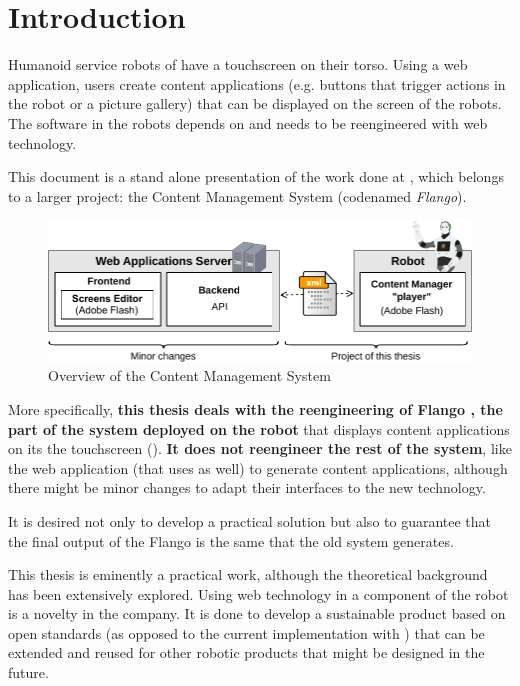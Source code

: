 \chapter{Introduction}

Humanoid service robots of \company have a touchscreen on their torso.
Using a web application, users create content applications (e.g. buttons that trigger actions in the robot or a picture gallery) that can be displayed on the screen of the robots.
The software in the robots depends on \flash and needs to be reengineered with web technology.

This document is a stand alone presentation of the work done at \company , which belongs to a larger project: the Content Management System (codenamed \textit{Flango}).
\begin{figure}[htb]
    \centering
    \includegraphics{figures/intro-system-overview.pdf}
    \caption{Overview of the Content Management System}
    \label{fig:intro-system-overview}
\end{figure}
More specifically, \textbf{this thesis deals with the reengineering of Flango \cm , the part of the system deployed \textbf{on the robot}} that displays content applications on its the touchscreen ().
\textbf{It does not reengineer the rest of the system}, like the web application (that uses \flash as well) to generate content applications, although there might be minor changes to adapt their interfaces to the new technology.

It is desired not only to develop a practical solution but also to guarantee that the final output of the Flango \cm is the same that the old system generates.

This thesis is eminently a practical work, although the theoretical background has been extensively explored. 
Using web technology in a component of the robot is a novelty in the company. 
It is done to develop a sustainable product based on open standards (as opposed to the current implementation with \flash) that can be extended and reused for other robotic products that might be designed in the future.

